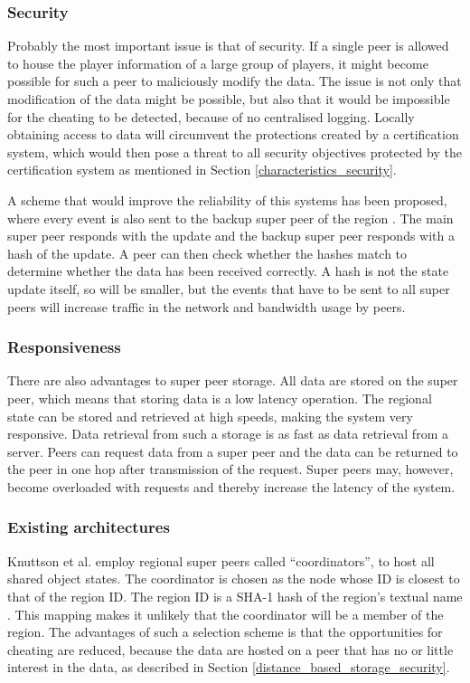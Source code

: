 \documentclass[10pt,a4paper,journal,cspaper,compsoc]{IEEEtran}
\begin{document}
\subsubsection{Security}

Probably the most important issue is that of security. If a single peer is allowed to house the player information of a large group of players, it
might become possible for such a peer to maliciously modify the data. The issue is not only that modification of the data might be possible, but also
that it would be impossible for the cheating to be detected, because of no centralised logging. Locally obtaining access to data will circumvent the
protections created by a certification system, which would then pose a threat to all security objectives protected by the certification system as
mentioned in Section \ref{characteristics_security}.

A scheme that would improve the reliability of this systems has been proposed, where every event is also sent to the backup super peer of the region
\cite{past_storage_focus}. The main super peer responds with the update and the backup super peer responds with a hash of the update. A peer can then
check whether the hashes match to determine whether the data has been received correctly. A hash is not the state update itself, so will be smaller,
but the events that have to be sent to all super peers will increase traffic in the network and bandwidth usage by peers.

\subsubsection{Responsiveness}
There are also advantages to super peer storage. All data are stored on the super peer, which means that storing data is a low latency operation. The
regional state can be stored and retrieved at high speeds, making the system very responsive. Data retrieval from such a storage is as fast as data
retrieval from a server. Peers can request data from a super peer and the data can be returned to the peer in one hop after transmission of the
request. Super peers may, however, become overloaded with requests and thereby increase the latency of the system.

\subsubsection{Existing architectures}

Knuttson et al. \cite{knutsson_p2p_first} employ regional super peers called ``coordinators'', to host all shared object states. The coordinator is
chosen as the node whose ID is closest to that of the region ID. The region ID is a SHA-1 hash of the region's textual name \cite{SHA}. This mapping
makes it unlikely that the coordinator will be a member of the region. The advantages of such a selection scheme is that the opportunities for
cheating are reduced, because the data are hosted on a peer that has no or little interest in the data, as described in Section
\ref{distance_based_storage_security}.
\end{document}
